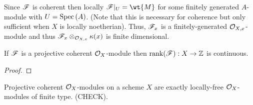\documentclass[12pt]{article}
\begin{document}
\begin{remark}
Since $\mathscr{F}$ is coherent then locally $\F |_U = \wt{M}$ for some finitely generated $A$-module with $U = \mathrm{Spec}\left( A \right)$. (Note that this is necessary for coherence but only sufficient when $X$ is locally noetherian). Thus, $\mathscr{F}_x$ is a finitely-generated $\mathcal{O}_{X, x}$-module and thus $\mathscr{F}_x \otimes_{\mathcal{O}_{X, x}} \kappa(x)$ is finite dimensional. 
\end{remark}

\begin{theorem}
If $\mathscr{F}$ is a projective coherent $\mathcal{O}_{X}$-module then $\mathrm{rank}(\mathscr{F}) : X \to \mathbb{Z}$ is continuous. 
\end{theorem}

\begin{proof}

\end{proof}

\begin{proposition}
Projective coherent $\mathcal{O}_{X}$-modules on a scheme $X$ are exactly locally-free $\mathcal{O}_{X}$-modules of finite type. (CHECK).
\end{proposition}
\end{document}

